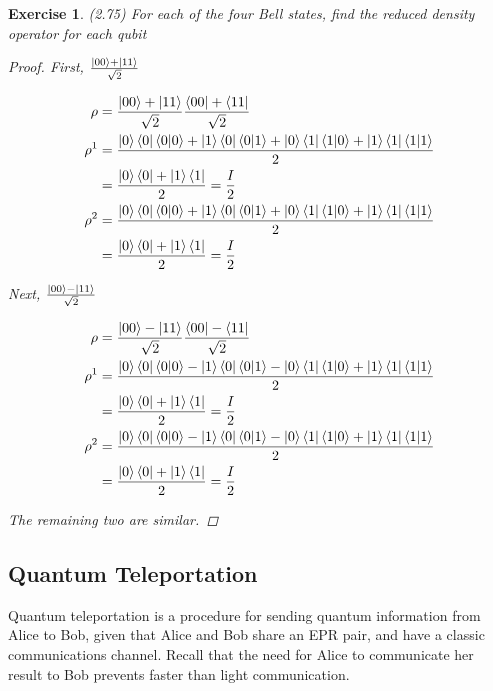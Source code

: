 \documentclass[11pt]{article}
\newcommand\0{\mathbf{0}}
\newcommand\<{\langle}
\renewcommand\>{\rangle}
\newtheorem{exercise}[theorem]{Exercise}
\begin{document}
\begin{exercise}
(2.75) For each of the four Bell states, find the reduced density operator for each qubit
\begin{proof}

First, $\frac{\ket{00} + \ket{11}}{\sqrt{2}}$

\begin{align*}
\rho &= \frac{\ket{00} + \ket{11}}{\sqrt{2}}\frac{\bra{00} + \bra{11}}{\sqrt{2}} \\
\rho^1 &= \frac{\ket{0}\bra{0}\bra{0}\ket{0}+\ket{1}\bra{0}\bra{0}\ket{1}+ \ket{0}\bra{1}\bra{1}\ket{0}+ \ket{1}\bra{1}\bra{1}\ket{1}}{2} \\
&= \frac{\ket{0}\bra{0} + \ket{1}\bra{1}}{2} = \frac{I}{2} \\
\rho^2 &= \frac{\ket{0}\bra{0}\bra{0}\ket{0}+\ket{1}\bra{0}\bra{0}\ket{1}+ \ket{0}\bra{1}\bra{1}\ket{0}+ \ket{1}\bra{1}\bra{1}\ket{1}}{2} \\
&= \frac{\ket{0}\bra{0} + \ket{1}\bra{1}}{2} = \frac{I}{2}
\end{align*}

Next, $\frac{\ket{00} - \ket{11} }{\sqrt{2}}$	

\begin{align*}
\rho &= \frac{\ket{00} - \ket{11}}{\sqrt{2}}\frac{\bra{00} - \bra{11}}{\sqrt{2}} \\
\rho^1 &= \frac{\ket{0}\bra{0}\bra{0}\ket{0}-\ket{1}\bra{0}\bra{0}\ket{1}- \ket{0}\bra{1}\bra{1}\ket{0}+ \ket{1}\bra{1}\bra{1}\ket{1}}{2} \\
&= \frac{\ket{0}\bra{0} + \ket{1}\bra{1}}{2} = \frac{I}{2} \\
\rho^2 &= \frac{\ket{0}\bra{0}\bra{0}\ket{0}-\ket{1}\bra{0}\bra{0}\ket{1}- \ket{0}\bra{1}\bra{1}\ket{0}+ \ket{1}\bra{1}\bra{1}\ket{1}}{2} \\
&= \frac{\ket{0}\bra{0} + \ket{1}\bra{1}}{2} = \frac{I}{2}
\end{align*}

The remaining two are similar.
\end{proof}	
\end{exercise}

\subsection{Quantum Teleportation}
Quantum teleportation is a procedure for sending quantum information from Alice to Bob, given that Alice and Bob share an EPR pair, and have a classic communications channel. Recall that the need for Alice to communicate her result to Bob prevents faster than light communication.
\end{document}
